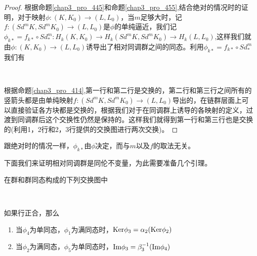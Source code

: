 \begin{proof}
根据命题\eqref{chap3_pro_445}和命题\eqref{chap3_pro_455},结合绝对的情况时的证明，对于映射$\phi:(K,K_{0})\rightarrow (L,L_{0})$，当$m$足够大时，记$f:(Sd^{m}K,Sd^{m}K_{0})\rightarrow (L,L_{0})$是$\phi$的单纯逼近，我们记$\phi_{k*}=f_{k*}\circ Sd^{m}_{*}:H_{k}(K,K_{0})\rightarrow H_{k}(Sd^{m}K,Sd^{m}K_{0})\rightarrow H_{k}(L,L_{0})$,这样我们就由$\phi:(K,K_{0})\rightarrow (L,L_{0})$诱导出了相对同调群之间的同态。利用$\phi_{k*}=f_{k*}\circ Sd^{m}_{*}$我们有
{\center
{}
\\}
根据命题\eqref{chap3_pro_414},第一行和第二行是交换的，第二行和第三行之间所有的竖箭头都是由单纯映射$f:(Sd^{m}K,Sd^{m}K_{0})\rightarrow (L,L_{0})$导出的，在链群层面上可以直接验证各方块都是交换的，根据我们对于在同调群上诱导的各映射的定义，过渡到同调群后这个交换性仍然是保持的。这样我们就得到第一行和第三行也是交换的(利用1，2行和2，3行提供的交换图进行两次交换)。
\end{proof}
\begin{remark}
跟绝对时的情况一样，$\phi_{k*}$由$\phi$决定，而与$m$以及$f$的取法无关。
\end{remark}
下面我们来证明相对同调群是同伦不变量，为此需要准备几个引理。
\begin{proposition}
在群和群同态构成的下列交换图中
{\center{}\\}
如果行正合，那么
\begin{enumerate}
    \item 当$\phi_{4}$为单同态，$\phi_{1}$为满同态时，${\rm Ker} \phi_{3}=\alpha_{2}({\rm Ker} \phi_{2})$
    \item 当$\phi_{2}$为满同态，$\phi_{5}$为单同态时，${\rm Im} \phi_{3}=\beta_{3}^{-1}({\rm Im} \phi_{4})$
\end{enumerate}
\end{proposition}
